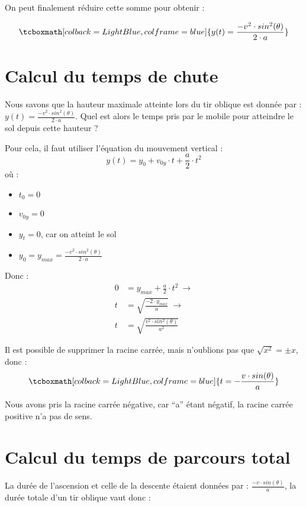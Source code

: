 On peut finalement réduire cette somme pour obtenir :


\begin{equation}
    \tcboxmath[colback=LightBlue,colframe=blue]{y(t)=\frac{-v^2 \cdot sin^2(\theta)}{2 \cdot a}}
\end{equation}

\section{Calcul du temps de chute}
Nous savons que la hauteur maximale atteinte lors du tir oblique est donnée par : \(y(t)=\frac{-v^2 \cdot sin^2(\theta)}{2 \cdot a}\). Quel est alors le temps pris par le mobile pour atteindre le sol depuis cette hauteur ?

Pour cela, il faut utiliser l'équation du mouvement vertical :
\begin{equation}
    y(t)=y_0 + v_{0y} \cdot t + \frac{a}{2} \cdot t^2
\end{equation} où :

\begin{itemize}[label=\textbullet]
    \item \(t_0=0\)
    \item \(v_{0y}=0\)
    \item \(y_t=0\), car on atteint le sol
    \item \(y_0=y_{max}=\frac{-v^2 \cdot sin^2(\theta)}{2 \cdot a}\)
\end{itemize}

Donc :
\begin{align}
    0 & =y_{max}+\frac{a}{2} \cdot t^2 \ \rightarrow     \\
    t & =\sqrt{\frac{-2 \cdot y_{max}}{a}} \ \rightarrow \\
    t & =\sqrt{\frac{v^2 \cdot sin^2 (\theta)}{a^2}}
\end{align}

Il est possible de supprimer la racine carrée, mais n'oublions pas que \(\sqrt{x^2}=\pm x\), donc :
\begin{equation}
    \tcboxmath[colback=LightBlue,colframe=blue]{t=-\frac{v \cdot sin(\theta)}{a}}
\end{equation}

Nous avons pris la racine carrée négative, car \enquote{a} étant négatif, la racine carrée positive n'a pas de sens.

\section{Calcul du temps de parcours total}
La durée de l'ascension et celle de la descente étaient données par : \(\frac{-v \cdot sin(\theta)}{a}\), la durée totale d'un tir oblique vaut donc :

